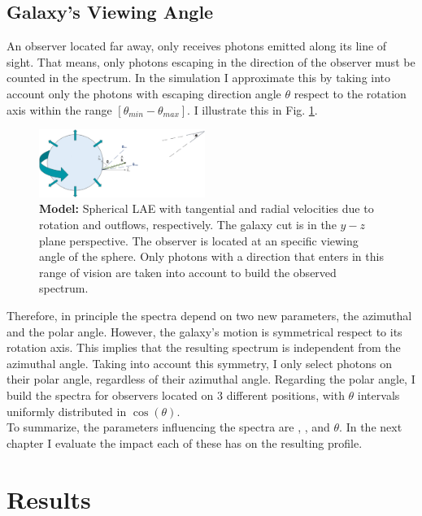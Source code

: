 \documentclass[twocolappendix]{latex/emulateapj}
\begin{document}
\subsection{Galaxy's Viewing Angle}
An observer located far away, only receives photons emitted along its line of sight. That means, only photons escaping in the direction of the observer must be counted in the spectrum. In the simulation I approximate this by taking into account only the photons with escaping direction angle $\theta$ respect to the rotation axis within the range $[\theta_{min}-\theta_{max}]$. I illustrate this in Fig. \ref{fig:model}. \\

\begin{figure}[h!]
	\begin{center}
		\includegraphics[width=0.48\textwidth]{./figures/model}
	\end{center}
	\caption{\textbf{Model:} Spherical LAE with tangential and radial velocities due to rotation and outflows, respectively. The galaxy cut is in the $y-z$ plane perspective. The observer is located at an specific viewing angle of the sphere. Only photons with a direction that enters in this range of vision are taken into account to build the observed spectrum.
		\label{fig:model}}
\end{figure}

Therefore, in principle the spectra depend on two new parameters, the azimuthal and the polar angle. However, the galaxy's motion is symmetrical respect to its rotation axis. This implies that the resulting spectrum is independent from the azimuthal angle. Taking into account this symmetry, I only select photons on their polar angle, regardless of their azimuthal angle. Regarding the polar angle, I build the spectra for observers located on 3 different positions, with $\theta$ intervals uniformly distributed in $\cos(\theta)$. \\ 

To summarize, the parameters influencing the spectra are \vrot, \vout, \tauh and $\theta$. In the next chapter I evaluate the impact each of these has on the resulting profile. \\


\section{Results}
\label{sec:results}
\end{document}
